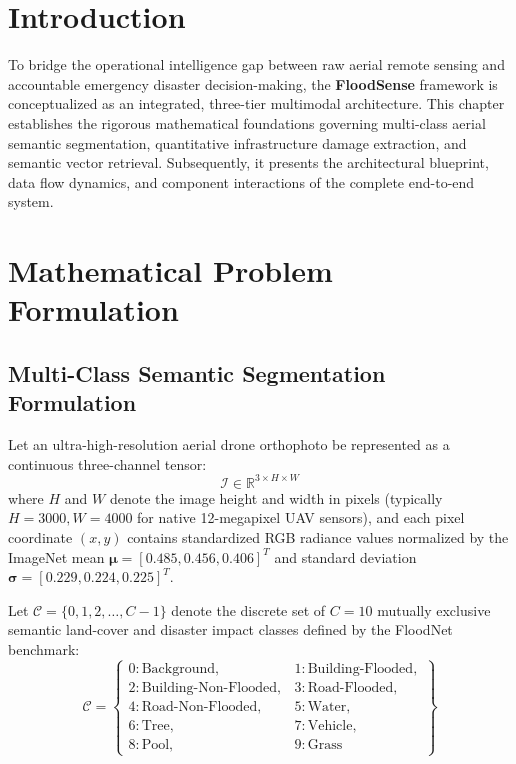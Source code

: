 \label{chap:system_architecture}

\section{Introduction}
To bridge the operational intelligence gap between raw aerial remote sensing and accountable emergency disaster decision-making, the \textbf{FloodSense} framework is conceptualized as an integrated, three-tier multimodal architecture. This chapter establishes the rigorous mathematical foundations governing multi-class aerial semantic segmentation, quantitative infrastructure damage extraction, and semantic vector retrieval. Subsequently, it presents the architectural blueprint, data flow dynamics, and component interactions of the complete end-to-end system.

\section{Mathematical Problem Formulation}

\subsection{Multi-Class Semantic Segmentation Formulation}
Let an ultra-high-resolution aerial drone orthophoto be represented as a continuous three-channel tensor:
\begin{equation}
    \mathcal{I} \in \mathbb{R}^{3 \times H \times W}
\end{equation}
where $H$ and $W$ denote the image height and width in pixels (typically $H = 3000, W = 4000$ for native 12-megapixel UAV sensors), and each pixel coordinate $(x, y)$ contains standardized RGB radiance values normalized by the ImageNet mean $\boldsymbol{\mu} = [0.485, 0.456, 0.406]^T$ and standard deviation $\boldsymbol{\sigma} = [0.229, 0.224, 0.225]^T$.

Let $\mathcal{C} = \{0, 1, 2, \dots, C-1\}$ denote the discrete set of $C = 10$ mutually exclusive semantic land-cover and disaster impact classes defined by the FloodNet benchmark:
\begin{equation}
    \mathcal{C} = \left\{
    \begin{array}{ll}
        0: \text{Background}, & 1: \text{Building-Flooded}, \\
        2: \text{Building-Non-Flooded}, & 3: \text{Road-Flooded}, \\
        4: \text{Road-Non-Flooded}, & 5: \text{Water}, \\
        6: \text{Tree}, & 7: \text{Vehicle}, \\
        8: \text{Pool}, & 9: \text{Grass}
    \end{array}
    \right\}
\end{equation}

